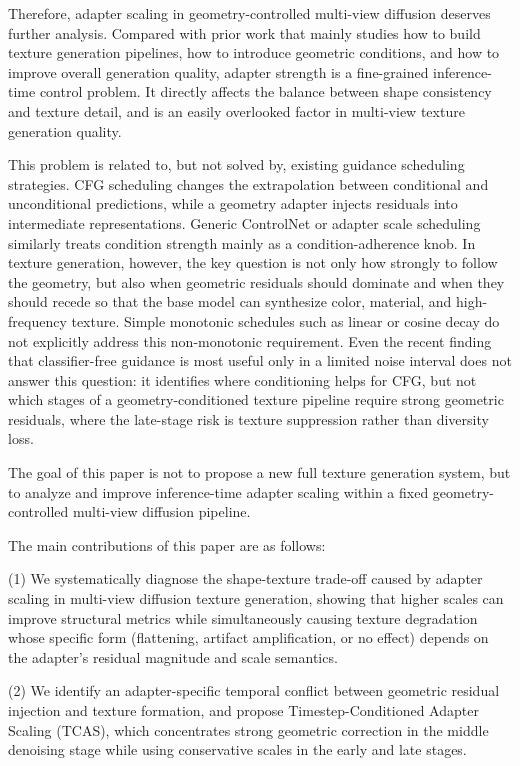 \documentclass[times,twocolumn,final]{elsarticle}
\begin{document}
Therefore, adapter scaling in geometry-controlled multi-view diffusion deserves further analysis. Compared with prior work that mainly studies how to build texture generation pipelines, how to introduce geometric conditions, and how to improve overall generation quality, adapter strength is a fine-grained inference-time control problem. It directly affects the balance between shape consistency and texture detail, and is an easily overlooked factor in multi-view texture generation quality.

This problem is related to, but not solved by, existing guidance scheduling strategies. CFG scheduling changes the extrapolation between conditional and unconditional predictions, while a geometry adapter injects residuals into intermediate representations. Generic ControlNet or adapter scale scheduling similarly treats condition strength mainly as a condition-adherence knob. In texture generation, however, the key question is not only how strongly to follow the geometry, but also when geometric residuals should dominate and when they should recede so that the base model can synthesize color, material, and high-frequency texture. Simple monotonic schedules such as linear or cosine decay do not explicitly address this non-monotonic requirement. Even the recent finding that classifier-free guidance is most useful only in a limited noise interval \cite{kynkanniemi2024limited} does not answer this question: it identifies where conditioning helps for CFG, but not which stages of a geometry-conditioned texture pipeline require strong geometric residuals, where the late-stage risk is texture suppression rather than diversity loss.

The goal of this paper is not to propose a new full texture generation system, but to analyze and improve inference-time adapter scaling within a fixed geometry-controlled multi-view diffusion pipeline.

The main contributions of this paper are as follows:

(1) We systematically diagnose the shape-texture trade-off caused by adapter scaling in multi-view diffusion texture generation, showing that higher scales can improve structural metrics while simultaneously causing texture degradation whose specific form (flattening, artifact amplification, or no effect) depends on the adapter's residual magnitude and scale semantics.

(2) We identify an adapter-specific temporal conflict between geometric residual injection and texture formation, and propose Timestep-Conditioned Adapter Scaling (TCAS), which concentrates strong geometric correction in the middle denoising stage while using conservative scales in the early and late stages.
\end{document}
